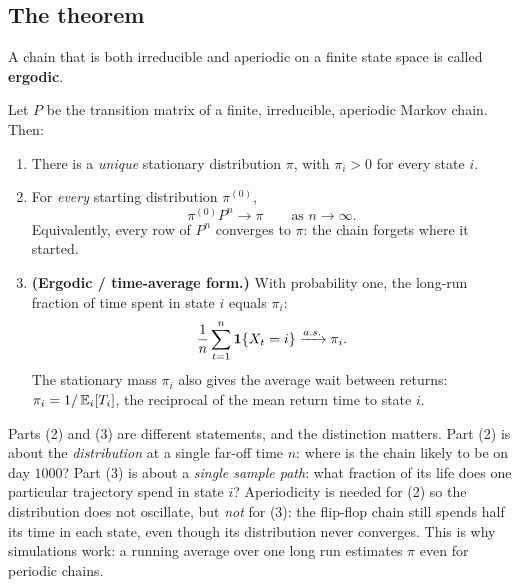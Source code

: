 \subsection{The theorem}
A chain that is both irreducible and aperiodic on a finite state space is called
\textbf{ergodic}.
\begin{theorem}
\label{ch24:thm-convergence}
Let $P$ be the transition matrix of a finite, irreducible, aperiodic Markov chain.
Then:
\begin{enumerate}
  \item There is a \emph{unique} stationary distribution $\pi$, with $\pi_i > 0$
    for every state $i$.
  \item For \emph{every} starting distribution $\pi^{(0)}$,
    \[
      \pi^{(0)} P^n \longrightarrow \pi \qquad \text{as } n\to\infty .
    \]
    Equivalently, every row of $P^n$ converges to $\pi$: the chain forgets where
    it started.
  \item \textbf{(Ergodic / time-average form.)} With probability one, the
    long-run fraction of time spent in state $i$ equals $\pi_i$:
    \[
      \frac{1}{n}\sum_{t=1}^{n} \mathbf{1}\{X_t = i\} \xrightarrow{a.s.} \pi_i .
    \]
    The stationary mass $\pi_i$ also gives the average wait between returns:
    $\pi_i = 1/\operatorname{\mathbb{E}}_i[T_i]$, the reciprocal of the mean return time to state $i$.
\end{enumerate}
\end{theorem}
Parts (2) and (3) are different statements, and the distinction matters. Part (2)
is about the \emph{distribution} at a single far-off time $n$: where is the
chain likely to be on day $1000$? Part (3) is about a \emph{single sample path}:
what fraction of its life does one particular trajectory spend in state $i$?
Aperiodicity is needed for (2) so the distribution does not oscillate, but
\emph{not} for (3): the flip-flop chain still spends half its time in each state,
even though its distribution never converges. This is why simulations work: a
running average over one long run estimates $\pi$ even for periodic chains.
